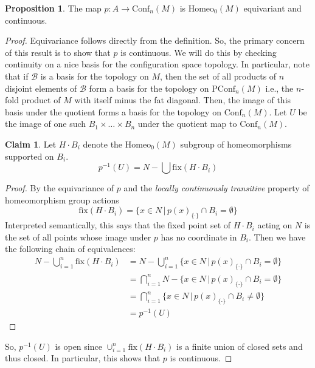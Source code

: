 \documentclass[10pt, oneside]{article}
\newcommand{\homeo}[1][S^1]{\text{Homeo}_0(#1)}
\newcommand{\conf}[2][S^1]{\text{Conf}_{#2}(#1)}
\newcommand{\pconf}[2][S^1]{\text{PConf}_{#2}(#1)}
\newcommand{\set}{{\{\cdot\}}}
\theoremstyle{definition}
\newtheorem{prop}{Proposition}[section]
\newtheorem*{clm*}{Claim}
\theoremstyle{definition}
\begin{document}
\begin{prop}
    The map $p: A\to \conf[M]{n}$ is $\homeo[M]$ equivariant and continuous.
\end{prop}
\begin{proof}
    Equivariance follows directly from the definition.
    So, the primary concern of this result is to show that $p$ is continuous.
    We will do this by checking continuity on a nice basis for the configuration space topology.
    In particular,
    note that if $\mathscr{B}$ is a basis for the topology on $M$,
    then the set of all products of $n$ disjoint elements of $\mathscr{B}$ form a basis for the topology on $\pconf[M]{n}$
    i.e., the $n$-fold product of $M$ with itself minus the fat diagonal.
    Then, the image of this basis under the quotient forms a basis for the topology on $\conf[M]{n}$.
    Let $U$ be the image of one such $B_1\times\dots\times B_n$
    under the quotient map to $\conf[M]{n}$.

    \begin{clm*}
        Let $H\cdot B_i$ denote the $\homeo[M]$ subgroup of homeomorphisms supported on $B_i$.
        $$p^{-1}(U) = N - \bigcup \text{fix}(H\cdot B_i)$$
    \end{clm*}
    \begin{proof}
        By the equivariance of $p$
        and the \textit{locally continuously transitive} property of homeomorphism group actions
        $$\text{fix}(H\cdot B_i) = \{x\in N\, |\, p(x)_\set\cap B_i = \emptyset\}$$
        Interpreted semantically,
        this says that
        the fixed point set of $H\cdot B_i$ acting on $N$ is
        the set of all points whose image under $p$ has no coordinate in $B_i$.
        Then we have the following chain of equivalences:
        \begin{align*}
            N - \bigcup_{i=1}^n\text{fix}(H\cdot B_i) &= N - \bigcup_{i=1}^n\{x\in N\, |\, p(x)_\set\cap B_i = \emptyset\}\\
            &= \bigcap_{i=1}^n N - \{x\in N\, |\, p(x)_\set\cap B_i = \emptyset\}\\
            &= \bigcap_{i=1}^n \{x\in N\, |\, p(x)_\set\cap B_i \neq \emptyset\}\\
            &= p^{-1}(U)
        \end{align*}
    \end{proof}
    So,
    $p^{-1}(U)$ is open
    since $\cup_{i=1}^n\text{fix}(H\cdot B_i)$ is a finite union of closed sets
    and thus closed.
    In particular,
    this shows that $p$ is continuous.
\end{proof}
\end{document}
